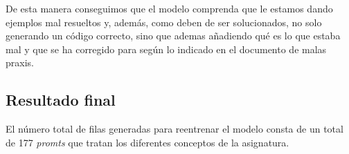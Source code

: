 De esta manera conseguimos que el modelo comprenda que le estamos dando ejemplos mal resueltos y, además, como deben de ser solucionados, no solo generando un código correcto, sino que ademas añadiendo qué es lo que estaba mal y que se ha corregido para según lo indicado en el documento de malas praxis.

\subsection{Resultado final}
El número total de filas generadas para reentrenar el modelo consta de un total de 177 \textit{promts} que tratan los diferentes conceptos de la asignatura.
